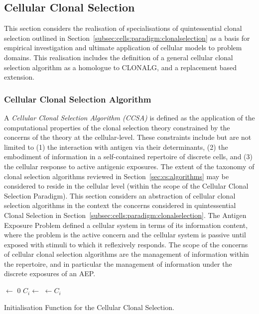 %
%
\subsection{Cellular Clonal Selection}
\label{sec:cells:realised:algorithms}
This section considers the realisation of specialisations of quintessential clonal selection outlined in Section~\ref{subsec:cells:paradigm:clonalselection} as a basis for empirical investigation and ultimate application of cellular models to problem domains. This realisation includes the definition of a general cellular clonal selection algorithm as a homologue to CLONALG, and a replacement based extension.

%
%
\subsubsection{Cellular Clonal Selection Algorithm}
A \emph{Cellular Clonal Selection Algorithm (CCSA)} is defined as the application of the computational properties of the clonal selection theory constrained by the concerns of the theory at the cellular-level. These constraints include but are not limited to (1) the interaction with antigen via their determinants, (2) the embodiment of information in a self-contained repertoire of discrete cells, and (3) the cellular response to active antigenic exposures. The extent of the taxonomy of clonal selection algorithms reviewed in Section~\ref{sec:cs:algorithms} may be considered to reside in the cellular level (within the scope of the Cellular Clonal Selection Paradigm).
This section considers an abstraction of cellular clonal selection algorithms in the context the concerns considered in quintessential Clonal Selection in Section~\ref{subsec:cells:paradigm:clonalselection}. The Antigen Exposure Problem defined a cellular system in terms of its information content, where the problem is the active concern and the cellular system is passive until exposed with stimuli to which it reflexively responds. The scope of the concerns of cellular clonal selection algorithms are the management of information within the repertoire, and in particular the management of information under the discrete exposures of an AEP.

\begin{algorithm}[ht]
  \SetLine
  \KwOut{\T}  
  
	\T $\leftarrow$ 0\;	
	{
		$C_i \leftarrow$ \CreateCell{}\;
		\T $\leftarrow C_i$\;
	}
	\Return{\T}\;
	\caption{Initialisation Function for the Cellular Clonal Selection.}
	\label{alg:cells:realisation:algorithms:ccsa:init}
\end{algorithm}


